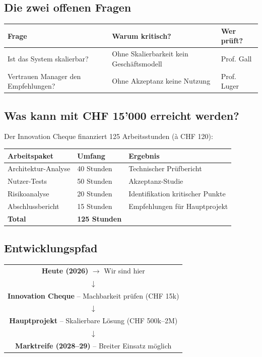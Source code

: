 \documentclass[11pt,a4paper]{article}
\begin{document}
\subsection{Die zwei offenen Fragen}

\begin{table}[h]
\centering
\begin{tabular}{@{}L{5cm}L{5cm}L{3cm}@{}}
\toprule
\textbf{Frage} & \textbf{Warum kritisch?} & \textbf{Wer prüft?} \\
\midrule
Ist das System skalierbar? & Ohne Skalierbarkeit kein Geschäftsmodell & Prof. Gall \\
Vertrauen Manager den Empfehlungen? & Ohne Akzeptanz keine Nutzung & Prof. Luger \\
\bottomrule
\end{tabular}
\end{table}

\subsection{Was kann mit CHF 15'000 erreicht werden?}

Der Innovation Cheque finanziert 125 Arbeitsstunden (à CHF 120):

\begin{table}[h]
\centering
\begin{tabular}{@{}L{4cm}L{3cm}L{6cm}@{}}
\toprule
\textbf{Arbeitspaket} & \textbf{Umfang} & \textbf{Ergebnis} \\
\midrule
Architektur-Analyse & 40 Stunden & Technischer Prüfbericht \\
Nutzer-Tests & 50 Stunden & Akzeptanz-Studie \\
Risikoanalyse & 20 Stunden & Identifikation kritischer Punkte \\
Abschlussbericht & 15 Stunden & Empfehlungen für Hauptprojekt \\
\midrule
\textbf{Total} & \textbf{125 Stunden} & \\
\bottomrule
\end{tabular}
\end{table}

\subsection{Entwicklungspfad}

\begin{center}
\begin{tabular}{c}
\textbf{Heute (2026)} $\rightarrow$ Wir sind hier \\
$\downarrow$ \\
\textbf{Innovation Cheque} -- Machbarkeit prüfen (CHF 15k) \\
$\downarrow$ \\
\textbf{Hauptprojekt} -- Skalierbare Lösung (CHF 500k--2M) \\
$\downarrow$ \\
\textbf{Marktreife (2028--29)} -- Breiter Einsatz möglich \\
\end{tabular}
\end{center}
\end{document}

